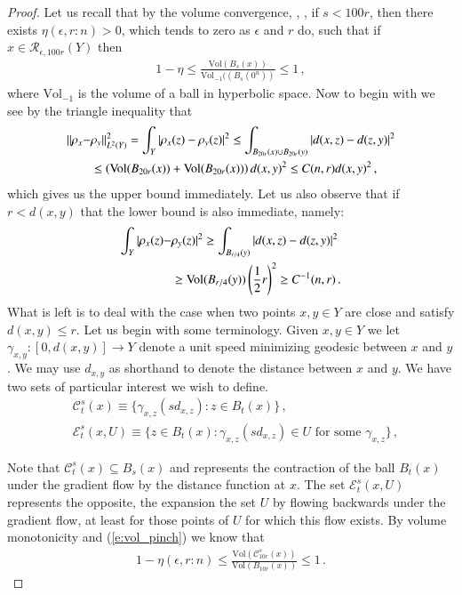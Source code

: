 \documentclass[11pt]{article}
\newcommand{\Vol}{\text{Vol}}
\newcommand{\cC}{\mathcal{C}}
\newcommand{\cE}{\mathcal{E}}
\newcommand{\cR}{\mathcal{R}}
\begin{document}
\begin{proof}
Let us recall that by the volume convergence, \cite{C}, \cite{ChC2}, if $s<100r$, then there exists $\eta(\epsilon,r:n)>0$, which tends to zero as $\epsilon$ and $r$ do, such that if $x\in\cR_{\epsilon,100r}(Y)$ then
\begin{align}\label{e:vol_pinch}
1-\eta\leq \frac{\Vol(B_s(x))}{\Vol_{-1}((B_s(0^n))}\leq 1\, ,
\end{align}
where $\Vol_{-1}$ is the volume of a ball in hyperbolic space.  Now to begin with we see by the triangle inequality that
\begin{align}
||\rho_x-&\rho_y||^2_{L^2(Y)}=\int_Y |\rho_x(z)-\rho_y(z)|^2\leq \int_{B_{20r}(x)\cup B_{20r}(y)}|d(x,z)-d(z,y)|^2\notag\\
&\leq\left(\Vol(B_{20r}(x))+\Vol(B_{20r}(x))\right)d(x,y)^2\leq C(n,r)d(x,y)^2\, ,
\end{align}
which gives us the upper bound immediately.  Let us also observe that if $r<d(x,y)$ that the lower bound is also immediate, namely:
\begin{align}
\int_Y |\rho_x(z)-&\rho_y(z)|^2\geq \int_{B_{r/4}(y)}|d(x,z)-d(z,y)|^2\notag\\
&\geq \Vol(B_{r/4}(y))\left(\frac{1}{2}r\right)^2\geq C^{-1}(n,r)\, .
\end{align}
What is left is to deal with the case when two points $x,y\in Y$ are close and satisfy $d(x,y)\leq r$.  Let us begin with some terminology.  Given $x,y\in Y$ we let $\gamma_{x,y}:[0,d(x,y)]\rightarrow Y$ denote a unit speed minimizing geodesic between $x$ and $y$.  We may use $d_{x,y}$ as shorthand to denote the distance between $x$ and $y$.  We have two sets of particular interest we wish to define.
\begin{align}
&\cC^{s}_{t}(x)\equiv\{\gamma_{x,z}(s d_{x,z}):z\in B_t(x)\}\, ,\\
&\cE^{s}_{t}(x,U)\equiv\{z\in B_{t}(x):\gamma_{x,z}(s d_{x,z})\in U\text{ for some }\gamma_{x,z}\}\, ,
\end{align}

Note that $\cC^{s}_{t}(x)\subseteq B_s(x)$ and represents the contraction of the ball $B_t(x)$ under the gradient flow by the distance function at $x$.  The set $\cE^s_t(x,U)$ represents the opposite, the expansion the set $U$ by flowing backwards under the gradient flow, at least for those points of $U$ for which this flow exists.  By volume monotonicity and (\ref{e:vol_pinch}) we know that
\begin{align}\label{e:C_volume}
1-\eta(\epsilon,r:n)\leq \frac{\Vol(\cC^s_{10r}(x))}{\Vol(B_{10r}(x))} \leq 1\, .
\end{align}


\end{proof}
\end{document}
